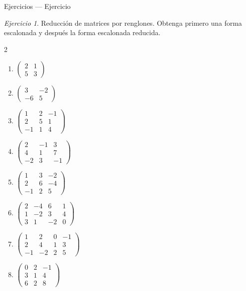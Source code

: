 \documentclass[aspectratio=169,11pt]{beamer}
\theoremstyle{remark}
\newtheorem{Ejer}[definicion]{Ejercicio}
\begin{document}
\begin{frame}[shrink=5]{Ejercicios — Ejercicio}
\footnotesize
\begin{Ejer} Reducción de matrices por renglones. Obtenga primero una forma escalonada y después la forma escalonada reducida.

\begin{multicols}{2}
\begin{enumerate}[resume]
\item $\begin{pmatrix}2&1\\5&3\end{pmatrix}$
\item $\begin{pmatrix}3&-2\\-6&5\end{pmatrix}$
\item $\begin{pmatrix}1&2&-1\\2&5&1\\-1&1&4\end{pmatrix}$
\item $\begin{pmatrix}2&-1&3\\4&1&7\\-2&3&-1\end{pmatrix}$
\item $\begin{pmatrix}1&3&-2\\2&6&-4\\-1&2&5\end{pmatrix}$
\item $\begin{pmatrix}2&-4&6&1\\1&-2&3&4\\3&1&-2&0\end{pmatrix}$
\item $\begin{pmatrix}1&2&0&-1\\2&4&1&3\\-1&-2&2&5\end{pmatrix}$
\item $\begin{pmatrix}0&2&-1\\3&1&4\\6&2&8\end{pmatrix}$
\end{enumerate}
\end{multicols}
\end{Ejer}
\end{frame}
\end{document}
